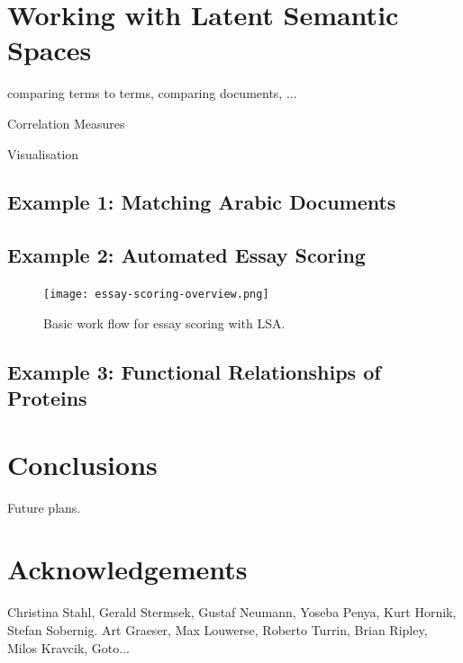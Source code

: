 \documentclass[article]{jss}
\begin{document}
\section{Working with Latent Semantic Spaces}

comparing terms to terms,
comparing documents,
...

Correlation Measures

Visualisation

\subsection[example information retrieval]{Example 1: Matching Arabic Documents}


\subsection[example essay scoring]{Example 2: Automated Essay Scoring}

\begin{figure}\label{fig:essayscoring}
  \centering
  \texttt{[image: essay-scoring-overview.png]}
  \caption{Basic work flow for essay scoring with LSA.}
\end{figure}


\subsection[example classification]{Example 3: Functional Relationships of Proteins}




\section[conclusions]{Conclusions}

Future plans.

\section[acknowledgements]{Acknowledgements}

Christina Stahl, Gerald Stermsek, Gustaf Neumann, Yoseba Penya, Kurt Hornik, Stefan Sobernig.
Art Graeser, Max Louwerse, Roberto Turrin, Brian Ripley, Milos Kravcik, Goto...


\end{document}
